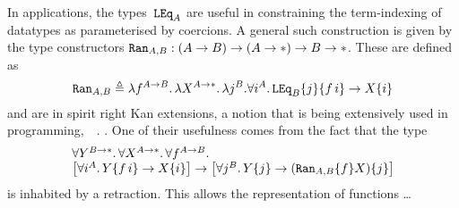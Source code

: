 In applications, the types~$\mathtt{LEq}_A$ are useful in constraining the
term-indexing of datatypes as parameterised by coercions.  A general such
construction is given by the type constructors $\mathtt{Ran}_{A,B}: (A\to B) \to
(A\to*) \to B\to *$.  These are defined as 
\[
\mathtt{Ran}_{A,B}
\triangleq
\lambda f^{A\to B}.\,
  \lambda X^{A\to*}.\,
    \lambda j^B.
      \forall i^A.\,
        \mathtt{LEq}_B \{j\} \{f\,i\}
	  \to X\{i\}
\]
and are in spirit right Kan extensions, a notion that is being extensively
used in programming,~\eg~\cite{AbeMatUus05,Ghani,Hinze}.  .  
%
One of their usefulness comes from the fact that the type
\[
\begin{array}{l}
\forall Y^{B\to*}.\,\forall X^{A\to*}.\,\forall f^{A\to B}.\,
\\
\big[\forall i^A.\,Y\{f\,i\}\to X\{i\}\big]
\to
\big[\forall j^B.\,Y\{j\}\to (\mathtt{Ran}_{A,B}\{f\} X)\{j\}\big]
\end{array}\]
is inhabited by a retraction.  This allows the representation of functions
\ldots

